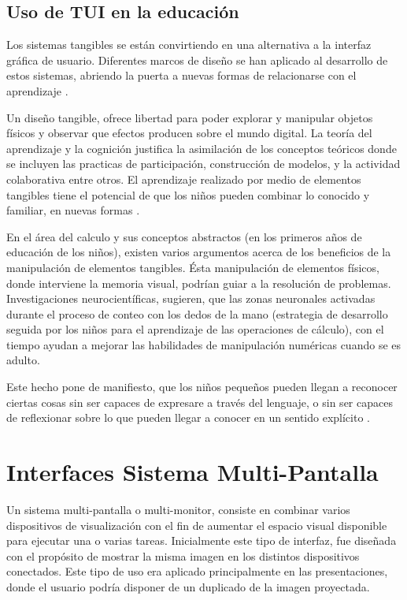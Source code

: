 \subsection{Uso de TUI en la educación}

Los sistemas tangibles se están convirtiendo en una alternativa a la interfaz gráfica de usuario. Diferentes marcos de diseño se han aplicado al desarrollo de estos sistemas, abriendo la puerta a nuevas formas de relacionarse con el aprendizaje \cite{Marshall}.

Un diseño tangible, ofrece libertad para poder explorar y manipular objetos físicos y observar que efectos producen sobre el mundo digital. La teoría del aprendizaje y la cognición justifica la asimilación de los conceptos teóricos donde se incluyen las practicas de participación, construcción de modelos, y la actividad colaborativa entre otros. El aprendizaje realizado por medio de elementos tangibles tiene el potencial de que los niños pueden combinar lo conocido y familiar, en nuevas formas \cite{Manches}.

En el área del calculo y sus conceptos abstractos (en los primeros años de educación de los niños), existen varios argumentos acerca de los beneficios de la manipulación de elementos tangibles. Ésta manipulación de elementos físicos, donde interviene la memoria visual, podrían guiar a la resolución de problemas. Investigaciones neurocientíficas, sugieren, que las zonas neuronales activadas durante el proceso de conteo con los dedos de la mano (estrategia de desarrollo seguida por los niños para el aprendizaje de las operaciones de cálculo), con el tiempo ayudan a mejorar las habilidades de manipulación numéricas cuando se es adulto. 

Este hecho pone de manifiesto, que los niños pequeños pueden llegan a reconocer ciertas cosas sin ser capaces de expresare a través del lenguaje, o sin ser capaces de reflexionar sobre lo que pueden llegar a conocer en un sentido explícito \cite{Malley}.





\section{Interfaces Sistema Multi-Pantalla}
Un sistema multi-pantalla o multi-monitor, consiste en combinar varios dispositivos de visualización con el fin de aumentar el espacio visual disponible para ejecutar una o varias tareas.
Inicialmente este tipo de interfaz, fue diseñada con el propósito de mostrar la misma imagen en los distintos dispositivos conectados. Este tipo de uso era aplicado principalmente en las presentaciones, donde el usuario podría disponer de un duplicado de la imagen proyectada.

